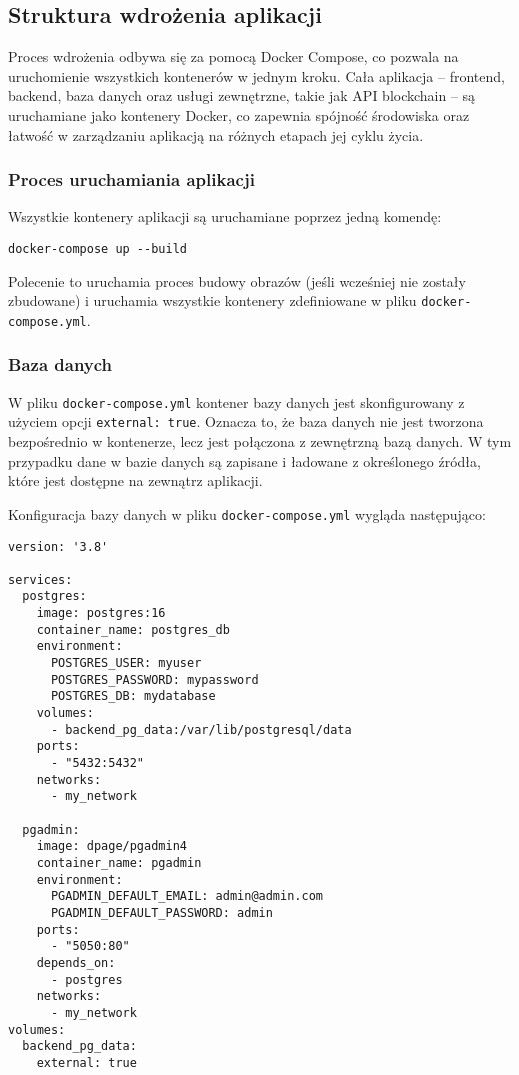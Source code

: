 \subsection{Struktura wdrożenia aplikacji}

Proces wdrożenia odbywa się za pomocą Docker Compose, co pozwala na uruchomienie wszystkich kontenerów w jednym kroku. Cała aplikacja – frontend, backend, baza danych oraz usługi zewnętrzne, takie jak API blockchain – są uruchamiane jako kontenery Docker, co zapewnia spójność środowiska oraz łatwość w zarządzaniu aplikacją na różnych etapach jej cyklu życia.

\subsubsection{Proces uruchamiania aplikacji}

Wszystkie kontenery aplikacji są uruchamiane poprzez jedną komendę:

\begin{verbatim}
docker-compose up --build
\end{verbatim}

Polecenie to uruchamia proces budowy obrazów (jeśli wcześniej nie zostały zbudowane) i uruchamia wszystkie kontenery zdefiniowane w pliku \texttt{docker-compose.yml}.

\subsubsection{Baza danych}

W pliku \texttt{docker-compose.yml} kontener bazy danych jest skonfigurowany z użyciem opcji \texttt{external: true}. Oznacza to, że baza danych nie jest tworzona bezpośrednio w kontenerze, lecz jest połączona z zewnętrzną bazą danych. W tym przypadku dane w bazie danych są zapisane i ładowane z określonego źródła, które jest dostępne na zewnątrz aplikacji.

Konfiguracja bazy danych w pliku \texttt{docker-compose.yml} wygląda następująco:

\begin{verbatim}
version: '3.8'

services:
  postgres:
    image: postgres:16
    container_name: postgres_db
    environment:
      POSTGRES_USER: myuser
      POSTGRES_PASSWORD: mypassword
      POSTGRES_DB: mydatabase
    volumes:
      - backend_pg_data:/var/lib/postgresql/data
    ports:
      - "5432:5432"
    networks:
      - my_network

  pgadmin:
    image: dpage/pgadmin4
    container_name: pgadmin
    environment:
      PGADMIN_DEFAULT_EMAIL: admin@admin.com
      PGADMIN_DEFAULT_PASSWORD: admin
    ports:
      - "5050:80"
    depends_on:
      - postgres
    networks:
      - my_network
volumes:
  backend_pg_data:
    external: true
\end{verbatim}

